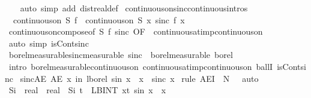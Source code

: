 \documentclass{article}
\theoremstyle{definition}
\begin{document}
\begin{isabellebody}
\ \ \isamarkupfalse%
\ {\isacharparenleft}auto\ simp\ add{\isacharcolon}\ dist{\isacharunderscore}real{\isacharunderscore}def{\isacharparenright}%
\isanewline
{}\isamarkupfalse%
\ continuous{\isacharunderscore}on{\isacharunderscore}sinc{\isacharbrackleft}continuous{\isacharunderscore}intros{\isacharbrackright}{\isacharcolon}\isanewline
\ \ {\isachardoublequoteopen}continuous{\isacharunderscore}on\ S\ f\ {\isasymLongrightarrow}\ continuous{\isacharunderscore}on\ S\ {\isacharparenleft}{\isasymlambda}x{\isachardot}\ sinc\ {\isacharparenleft}f\ x{\isacharparenright}{\isacharparenright}{\isachardoublequoteclose}\isanewline
{}\isamarkupfalse%
\ continuous{\isacharunderscore}on{\isacharunderscore}compose{\isacharbrackleft}of\ S\ f\ sinc{\isacharcomma}\ OF\ {\isacharunderscore}\ continuous{\isacharunderscore}at{\isacharunderscore}imp{\isacharunderscore}continuous{\isacharunderscore}on{\isacharbrackright}\isanewline
\ \ \isamarkupfalse%
\ {\isacharparenleft}auto\ simp{\isacharcolon}\ isCont{\isacharunderscore}sinc{\isacharparenright}%
\isanewline
{}\isamarkupfalse%
\ borel{\isacharunderscore}measurable{\isacharunderscore}sinc{\isacharbrackleft}measurable{\isacharbrackright}{\isacharcolon}\ {\isachardoublequoteopen}sinc\ {\isasymin}\ borel{\isacharunderscore}measurable\ borel{\isachardoublequoteclose}\isanewline
{}\isamarkupfalse%
\ {\isacharparenleft}intro\ borel{\isacharunderscore}measurable{\isacharunderscore}continuous{\isacharunderscore}on{}\ continuous{\isacharunderscore}at{\isacharunderscore}imp{\isacharunderscore}continuous{\isacharunderscore}on\ ballI\ isCont{\isacharunderscore}sinc{\isacharparenright}%
\isanewline
{}\isamarkupfalse%
\ sinc{\isacharunderscore}AE{\isacharcolon}\ {\isachardoublequoteopen}AE\ x\ in\ lborel{\isachardot}\ sin\ x\ {\isacharslash}\ x\ {\isacharequal}\ sinc\ x{\isachardoublequoteclose}\isanewline
{}\isamarkupfalse%
\ {\isacharparenleft}rule\ AE{\isacharunderscore}I\ {\isacharbrackleft}\ N\ {\isacharequal}\ {\isachardoublequoteopen}{\isacharbraceleft}{}{\isacharbraceright}{\isachardoublequoteclose}{\isacharbrackright}{\isacharcomma}\ auto{\isacharparenright}%
\isanewline
{}\isamarkupfalse%
\ Si\ {\isacharcolon}{\isacharcolon}\ {\isachardoublequoteopen}real\ {\isasymRightarrow}\ real{\isachardoublequoteclose}\ \ {\isachardoublequoteopen}Si\ t\ {\isasymequiv}\ LBINT\ x{\isacharequal}{}{\isachardot}{\isachardot}t{\isachardot}\ sin\ x\ {\isacharslash}\ x{\isachardoublequoteclose}\isanewline

\end{isabellebody}
\end{document}
